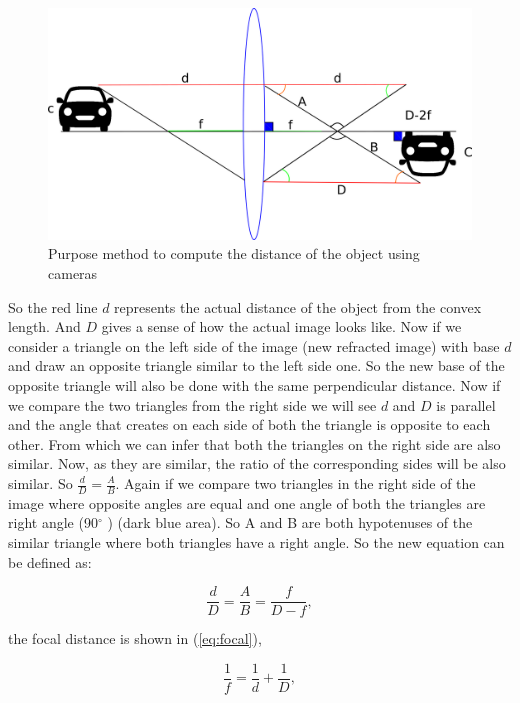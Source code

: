 \begin{figure}[H]
\centering
\includegraphics[width=\textwidth]{imagens/desenhando.png}
\caption{Purpose method to compute the distance of the object using cameras}
\label{fig:distance}
\end{figure}


So the red line $d$ represents the actual distance of the object from the convex length. And $D$ gives a sense of how the actual image looks like. Now if we consider a triangle on the left side of the image (new refracted image) with base $d$ and draw an opposite triangle similar to the left side one. So the new base of the opposite triangle will also be done with the same perpendicular distance. Now if we compare the two triangles from the right side we will see $d$ and $D$ is parallel and the angle that creates on each side of both the triangle is opposite to each other. From which we can infer that both the triangles on the right side are also similar. Now, as they are similar, the ratio of the corresponding sides will be also similar. So $\frac{d}{D} = \frac{A}{B}$. Again if we compare two triangles in the right side of the image where opposite angles are equal and one angle of both the triangles are right angle (90$^{\circ}$ ) (dark blue area). So A and B are both hypotenuses of the similar triangle where both triangles have a right angle. So the new equation can be defined as:

    \begin{equation}\label{eq:meausure}
        \frac{d}{D} = \frac{A}{B} = \frac{f}{D-f},
    \end{equation}

 the focal distance is shown in (\ref{eq:focal}), 

\begin{equation}\label{eq:focal}
    \frac{1}{f} = \frac{1}{d} + \frac{1}{D},
\end{equation}

